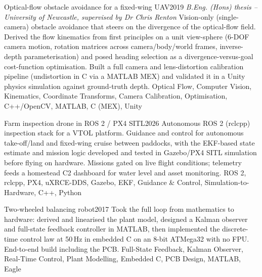 %
%
%


\begin{projects}
	\project
	{Optical-flow obstacle avoidance for a fixed-wing UAV}{2019}
	{\emph{B.Eng. (Hons) thesis -- University of Newcastle, supervised by Dr Chris Renton} \quad {}}
	{Vision-only (single-camera) obstacle avoidance that steers on the divergence of the optical-flow field.
	Derived the flow kinematics from first principles on a unit view-sphere (6-DOF camera motion, rotation
	matrices across camera/body/world frames, inverse-depth parameterisation) and posed heading selection as a
	divergence-versus-goal cost-function optimisation. Built a full camera and lens-distortion calibration
	pipeline (undistortion in C via a MATLAB MEX) and validated it in a Unity physics simulation against
	ground-truth depth.}
	{Optical Flow, Computer Vision, Kinematics, Coordinate Transforms, Camera Calibration, Optimisation, C++/OpenCV, MATLAB, C (MEX), Unity}

	\project
	{Farm inspection drone in ROS 2 / PX4 SITL}{2026}
	{}
	{Autonomous ROS 2 (rclcpp) inspection stack for a VTOL platform. Guidance and control for autonomous
	take-off/land and fixed-wing cruise between paddocks, with the EKF-based state estimate and mission logic
	developed and tested in Gazebo/PX4 SITL simulation before flying on hardware. Missions gated on live flight
	conditions; telemetry feeds a homestead C2 dashboard for water level and asset monitoring.}
	{ROS 2, rclcpp, PX4, uXRCE-DDS, Gazebo, EKF, Guidance \& Control, Simulation-to-Hardware, C++, Python}

	\project
	{Two-wheeled balancing robot}{2017}
	{}
	{Took the full loop from mathematics to hardware: derived and linearised the plant model, designed a Kalman
	observer and full-state feedback controller in MATLAB, then implemented the discrete-time control law at
	50\,Hz in embedded C on an 8-bit ATMega32 with no FPU. End-to-end build including the PCB.}
	{Full-State Feedback, Kalman Observer, Real-Time Control, Plant Modelling, Embedded C, PCB Design, MATLAB, Eagle}

\end{projects}
